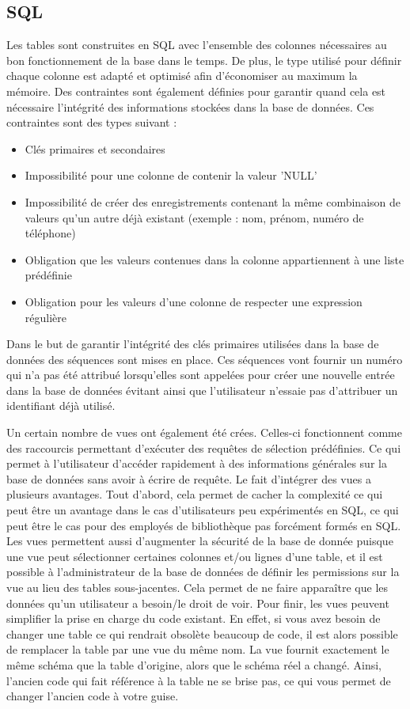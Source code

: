 \documentclass[11pt,a4paper]{article}
\begin{document}
\subsection{SQL}
Les tables sont construites en SQL avec l'ensemble des colonnes nécessaires au bon fonctionnement de la base dans le temps. De plus, le type utilisé pour définir chaque colonne est adapté et optimisé afin d'économiser au maximum la mémoire. Des contraintes sont également définies pour garantir quand cela est nécessaire l'intégrité des informations stockées dans la base de données.
Ces contraintes sont des types suivant :
\begin{itemize}
    \item Clés primaires et secondaires
    \item Impossibilité pour une colonne de contenir la valeur 'NULL'
    \item Impossibilité de créer des enregistrements contenant la même combinaison de valeurs qu'un autre déjà existant (exemple : nom, prénom, numéro de téléphone)
    \item Obligation que les valeurs contenues dans la colonne appartiennent à une liste prédéfinie
    \item Obligation pour les valeurs d'une colonne de respecter une expression régulière
\end{itemize}
\par
Dans le but de garantir l'intégrité des clés primaires utilisées dans la base de données des séquences sont mises en place. Ces séquences vont fournir un numéro qui n'a pas été attribué lorsqu'elles sont appelées pour créer une nouvelle entrée dans la base de données évitant ainsi que l'utilisateur n'essaie pas d'attribuer un identifiant déjà utilisé.
\par
Un certain nombre de vues ont également été crées. Celles-ci fonctionnent comme des raccourcis permettant d'exécuter des requêtes de sélection prédéfinies. Ce qui permet à l'utilisateur d'accéder rapidement à des informations générales sur la base de données sans avoir à écrire de requête. Le fait d'intégrer des vues a plusieurs avantages. Tout d'abord, cela permet de cacher la complexité ce qui peut être un avantage dans le cas d'utilisateurs peu expérimentés en SQL, ce qui peut être le cas pour des employés de bibliothèque pas forcément formés en SQL. Les vues permettent aussi d'augmenter la sécurité de la base de donnée puisque une vue peut sélectionner certaines colonnes et/ou lignes d'une table, et il est possible à l'administrateur de la base de données de définir les permissions sur la vue au lieu des tables sous-jacentes. Cela permet de ne faire apparaître que les données qu'un utilisateur a besoin/le droit de voir. Pour finir, les vues peuvent simplifier la prise en charge du code existant. En effet, si vous avez besoin de changer une table ce qui rendrait obsolète beaucoup de code, il est alors possible de remplacer la table par une vue du même nom. La vue fournit exactement le même schéma que la table d'origine, alors que le schéma réel a changé. Ainsi, l'ancien code qui fait référence à la table ne se brise pas, ce qui vous permet de changer l'ancien code à votre guise.
\end{document}
